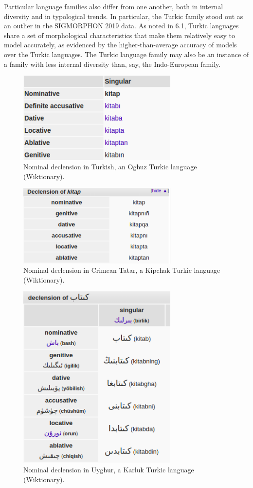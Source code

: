 Particular language families also differ from one another, both in internal diversity and in typological trends. In particular, the Turkic family stood out as an outlier in the SIGMORPHON 2019 data. As noted in 6.1, Turkic languages share a set of morphological characteristics that make them relatively easy to model accurately, as evidenced by the higher-than-average accuracy of models over the Turkic languages. The Turkic language family may also be an instance of a family with less internal diversity than, say, the Indo-European family. 

\begin{figure}[ht]
\includegraphics[width=8cm]{images/Turkish_kitap.png}
\centering
\caption{Nominal declension in Turkish, an Oghuz Turkic language (Wiktionary).}
\end{figure}

\begin{figure}[ht]
\includegraphics[width=8cm]{images/Crimean_Tatar_kitap.png}
\centering
\caption{Nominal declension in Crimean Tatar, a Kipchak Turkic language (Wiktionary).}
\end{figure}

\begin{figure}[p]
\includegraphics[width=8cm]{images/Uyghur_kitap.png}
\centering
\caption{Nominal declension in Uyghur, a Karluk Turkic language (Wiktionary).}
\end{figure}

